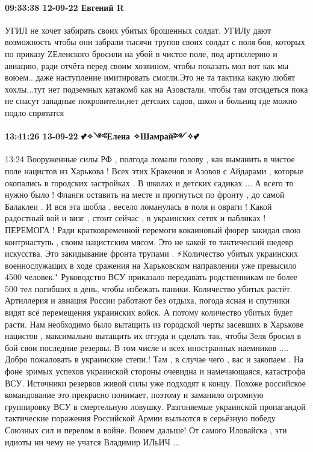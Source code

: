 \paragraph{09:33:38 12-09-22 Евгений R}

УГИЛ не хочет забирать своих убитых брошенных солдат. УГИЛу дают возможность
чтобы они забрали тысячи трупов своих солдат с поля боя, которых по приказу
ZЕленского бросили на убой в чистое поле, под артиллерию и авиацию, ради отчёта
перед своим хозяином, чтобы показать мол вот как мы воюем.. даже наступление
имитировать смогли.Это не та тактика какую любят хохлы...тут нет подземных
катакомб как на Азовстали, чтобы там отсидеться пока не спасут западные
покровители,нет детских садов, школ и больниц где можно подло спрятатся


\paragraph{13:41:26 13-09-22 💕✧༺Елена ✧Шамрай༻✧💕}

13:24
Вооруженные силы РФ , полгода ломали голову , как выманить в чистое поле нацистов из Харькова ! Всех этих Кракенов и Азовов с Айдарами , которые окопались в городских застройках . В школах и детских садиках ... А всего то нужно было ! Фланги оставить на месте и прогнуться по фронту , до самой Балаклеи .
И вся эта шобла , весело ломанулась в поля и овраги ! Какой радостный вой и визг , стоит сейчас , в украинских сетях и пабликах !
ПЕРЕМОГА !
Ради кратковременной перемоги кокаиновый фюрер закидал свою контрнаступь , своим нацистским мясом. Это не какой то тактический шедевр искусства. Это закидывание фронта трупами .
⚡Количество убитых украинских военнослужащих в ходе сражения на Харьковском направлении уже превысило 4500 человек."
Руководство ВСУ приказало передавать родственникам не более 500 тел погибших в день, чтобы избежать паники.
Количество убитых растёт. Артиллерия и авиация России работают без отдыха, погода ясная и спутники видят всё перемещения украинских войск. А потому количество убитых будет расти. Нам необходимо было вытащить из городской черты засевших в Харькове нацистов , максимально вытащить их оттуда и сделать так, чтобы Зеля бросил в бой свои последние резервы. В том числе и всех иностранных наемников ....
Добро пожаловать в украинские степи.!
Там , в случае чего , вас и закопаем .
На фоне зримых успехов украинской стороны очевидна и намечающаяся, катастрофа ВСУ. Источники резервов живой силы уже подходят к концу. Похоже российское командование это прекрасно понимает, поэтому и заманило огромную группировку ВСУ в смертельную ловушку. Разгоняемые украинской пропагандой тактические поражения Российской Армии выльются в серьёзную победу Союзных сил и перелом в войне. Воюем дальше!
От самого Иловайска , эти идиоты ни чему не учатся
Владимир ИЛьИЧ ...


